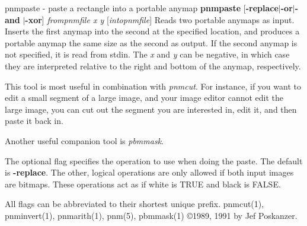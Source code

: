 pnmpaste - paste a rectangle into a portable anymap
{\bf pnmpaste}
{\rm [}{\bf -replace}{\rm $|$}{\bf -or}{\rm $|$}{\bf -and}
{\rm $|$}{\bf -xor}{\rm ]}
{\it frompnmfile x y}
{\rm [}{\it intopnmfile}{\rm ]}
Reads two portable anymaps as input.
Inserts the first anymap into the second at the specified location,
and produces a portable anymap the same size as the second as output.
If the second anymap is not specified, it is read from stdin.
The
{\it x}
and
{\it y}
can be negative, in which case they are interpreted
relative to the right and bottom of the anymap, respectively.
\par
This tool is most useful in combination with
{\it pnmcut}{\rm .}
For instance, if you want to edit a small segment of a large
image, and your image editor cannot edit the
large image, you can cut out the segment you are interested in,
edit it, and then paste it back in.
\par
Another useful companion tool is
{\it pbmmask}{\rm .}
\par
The optional flag specifies the operation to use when doing the paste.
The default is
{\bf -replace}{\rm .}
The other, logical operations are only allowed if both input images
are bitmaps.
These operations act as if white is TRUE and black is FALSE.
\par
All flags can be abbreviated to their shortest unique prefix.
pnmcut(1), pnminvert(1), pnmarith(1), pnm(5), pbmmask(1)
\copyright 1989, 1991 by Jef Poskanzer.
%
 
%

